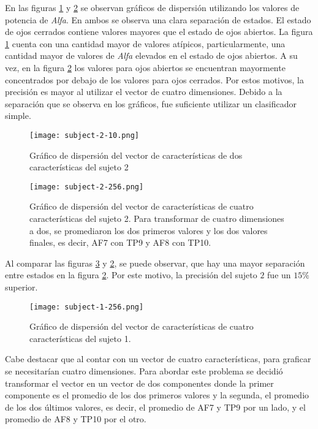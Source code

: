 En las figuras \ref{fig:subject-2-10} y \ref{fig:subject-2-256} se observan gráficos de dispersión utilizando los valores de potencia de \emph{Alfa}. En ambos se observa una clara separación de estados. El estado de ojos cerrados contiene valores mayores que el estado de ojos abiertos. La figura \ref{fig:subject-2-10} cuenta con una cantidad mayor de valores atípicos, particularmente, una cantidad mayor de valores de \emph{Alfa} elevados en el estado de ojos abiertos. A su vez, en la figura \ref{fig:subject-2-256} los valores para ojos abiertos se encuentran mayormente concentrados por debajo de los valores para ojos cerrados. Por estos motivos, la precisión es mayor al utilizar el vector de cuatro dimensiones. Debido a la separación que se observa en los gráficos, fue suficiente utilizar un clasificador simple.

 \begin{figure}[H]
	\centering
    \texttt{[image: subject-2-10.png]}
    \caption{Gráfico de dispersión del vector de características de dos características del sujeto 2}
	\label{fig:subject-2-10}
\end{figure}

 \begin{figure}[H]
	\centering
    \texttt{[image: subject-2-256.png]}
    \caption{Gráfico de dispersión del vector de características de cuatro características del sujeto 2. Para transformar de cuatro dimensiones a dos, se promediaron los dos primeros valores y los dos valores finales, es decir, AF7 con TP9 y AF8 con TP10.}
	\label{fig:subject-2-256}
\end{figure}


Al comparar las figuras \ref{fig:subject-1-256} y \ref{fig:subject-2-256}, se puede observar, que hay una mayor separación entre estados en la figura \ref{fig:subject-2-256}. Por este motivo, la precisión del sujeto $2$ fue un $15\%$ superior.

 \begin{figure}[H]
	\centering
    \texttt{[image: subject-1-256.png]}
    \caption{Gráfico de dispersión del vector de características de cuatro características del sujeto 1.}
	\label{fig:subject-1-256}
\end{figure}

Cabe destacar que al contar con un vector de cuatro características, para graficar se necesitarían cuatro dimensiones. Para abordar este problema se decidió transformar el vector en un vector de dos componentes donde la primer componente es el promedio de los dos primeros valores y la segunda, el promedio de los dos últimos valores, es decir, el promedio de AF7 y TP9 por un lado, y el promedio de AF8 y TP10 por el otro.

